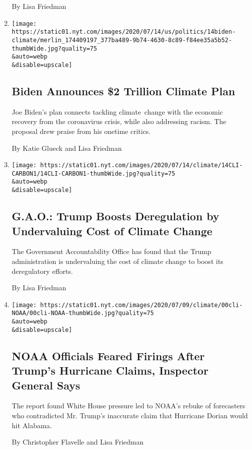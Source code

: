 \begin{enumerate}
  By Lisa Friedman
\item
  \href{/2020/07/14/us/politics/biden-climate-plan.html}{}

  \texttt{[image: https://static01.nyt.com/images/2020/07/14/us/politics/14biden-climate/merlin\_174409197\_377ba489-9b74-4630-8c89-f84ee35a5b52-thumbWide.jpg?quality=75\\\&auto=webp\\\&disable=upscale]}

  \hypertarget{biden-announces-2-trillion-climate-plan}{%
  \subsection{Biden Announces \$2 Trillion Climate
  Plan}\label{biden-announces-2-trillion-climate-plan}}

  Joe Biden's plan connects tackling climate~change with the economic
  recovery from the coronavirus crisis, while also addressing racism.
  The proposal drew praise from his onetime critics.

  By Katie Glueck and Lisa Friedman
\item
  \href{/2020/07/14/climate/trump-climate-change-carbon-cost.html}{}

  \texttt{[image: https://static01.nyt.com/images/2020/07/14/climate/14CLI-CARBON1/14CLI-CARBON1-thumbWide.jpg?quality=75\\\&auto=webp\\\&disable=upscale]}

  \hypertarget{gao-trump-boosts-deregulation-by-undervaluing-cost-of-climate-change}{%
  \subsection{G.A.O.: Trump Boosts Deregulation by Undervaluing Cost of
  Climate
  Change}\label{gao-trump-boosts-deregulation-by-undervaluing-cost-of-climate-change}}

  The Government Accountability Office has found that the Trump
  administration is undervaluing the cost of climate change to boost its
  deregulatory efforts.

  By Lisa Friedman
\item
  \href{/2020/07/09/climate/trump-hurricane-dorian-noaa.html}{}

  \texttt{[image: https://static01.nyt.com/images/2020/07/09/climate/00cli-NOAA/00cli-NOAA-thumbWide.jpg?quality=75\\\&auto=webp\\\&disable=upscale]}

  \hypertarget{noaa-officials-feared-firings-after-trumps-hurricane-claims-inspector-general-says}{%
  \subsection{NOAA Officials Feared Firings After Trump's Hurricane
  Claims, Inspector General
  Says}\label{noaa-officials-feared-firings-after-trumps-hurricane-claims-inspector-general-says}}

  The report found White House pressure led to NOAA's rebuke of
  forecasters who contradicted Mr. Trump's inaccurate claim that
  Hurricane Dorian would hit Alabama.

  By Christopher Flavelle and Lisa Friedman
\end{enumerate}

